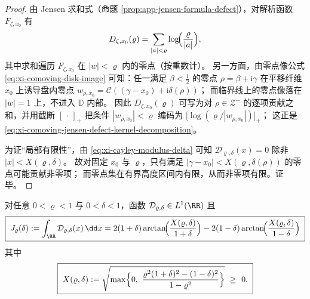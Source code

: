 \begin{proof}
由 Jensen 求和式（命题 \ref{prop:app-jensen-formula-defect}），对解析函数 \(F_{\zeta,x_0}\) 有
\[
D_{\zeta,x_0}(\varrho)=\sum_{|a|<\varrho}\log\!\Bigl(\frac{\varrho}{|a|}\Bigr),
\]
其中求和遍历 \(F_{\zeta,x_0}\) 在 \(|w|<\varrho\) 内的零点（按重数计）。
另一方面，由零点像公式 \eqref{eq:xi-comoving-disk-image} 可知：任一满足 \(\beta<\tfrac12\) 的零点 \(\rho=\beta+\mathrm{i}\gamma\) 在平移纤维 \(x_0\) 上诱导盘内零点
\(
w_{\rho,x_0}=\mathcal{C}((\gamma-x_0)+\mathrm{i}\delta(\rho))
\)；
而临界线上的零点像落在 \(|w|=1\) 上，不进入 \(\mathbb{D}\) 内部。
因此 \(D_{\zeta,x_0}(\varrho)\) 可写为对 \(\rho\in\mathcal{Z}^-\) 的逐项贡献之和，并用截断 \([\,\cdot\,]_+\) 把条件 \(|w_{\rho,x_0}|<\varrho\) 编码为
\(
\bigl[\log(\varrho/|w_{\rho,x_0}|)\bigr]_+
\)；
这正是 \eqref{eq:xi-comoving-jensen-defect-kernel-decomposition}。
\par
为证“局部有限性”，由 \eqref{eq:xi-cayley-modulus-delta} 可知 \(\mathcal{D}_{\varrho,\delta}(x)=0\) 除非 \(|x|<X(\varrho,\delta)\)。
故对固定 \(x_0\) 与 \(\varrho\)，只有满足 \(|\gamma-x_0|<X(\varrho,\delta(\rho))\) 的零点可能贡献非零项；
而零点集在有界高度区间内有限，从而非零项有限。证毕。
\end{proof}

\begin{proposition}[单零点积分缺陷的闭式表达]\label{prop:xi-single-defect-integrated-closed-form}
对任意 \(0<\varrho<1\) 与 \(0<\delta<1\)，函数 \(\mathcal{D}_{\varrho,\delta}\in L^1(\RR)\) 且
\begin{equation}\label{eq:xi-single-defect-integrated-closed-form}
\boxed{\;
J_{\varrho}(\delta):=\int_{\RR}\mathcal{D}_{\varrho,\delta}(x)\,\dd x
=2(1+\delta)\arctan\!\Bigl(\frac{X(\varrho,\delta)}{1+\delta}\Bigr)
-2(1-\delta)\arctan\!\Bigl(\frac{X(\varrho,\delta)}{1-\delta}\Bigr)\;}
\end{equation}
其中
\begin{equation}\label{eq:xi-single-defect-X}
\boxed{\;
X(\varrho,\delta)
:=\sqrt{\max\Bigl\{0,\ \frac{\varrho^2(1+\delta)^2-(1-\delta)^2}{1-\varrho^2}\Bigr\}}\ \ge\ 0.\;}
\end{equation}
\end{proposition}

